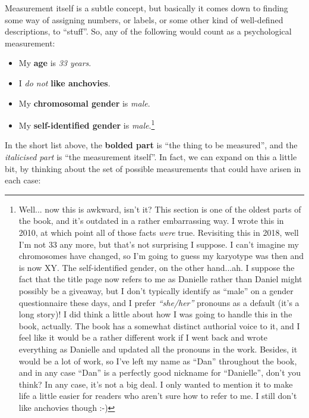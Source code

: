 
Measurement itself is a subtle concept, but basically it comes down to finding some way of assigning numbers, or labels, or some other kind of well-defined descriptions, to ``stuff''. So, any of the following would count as a psychological measurement:

\begin{itemize} \itemsep 0pt
\item My {\bf age} is {\it 33 years}.
\item I {\it do not} {\bf like anchovies}.
\item My {\bf chromosomal gender} is {\it male}. 
\item My {\bf self-identified gender} is {\it male}.\footnote{Well... now this is awkward, isn't it? This section is one of the oldest parts of the book, and it's outdated in a rather embarrassing way. I wrote this in 2010, at which point all of those facts {\it were} true. Revisiting this in 2018, well I'm not 33 any more, but that's not surprising I suppose. I can't imagine my chromosomes have changed, so I'm going to guess my karyotype was then and is now XY. The self-identified gender, on the other hand...ah. I suppose the fact that the title page now refers to me as Danielle rather than Daniel might possibly be a giveaway, but I don't typically identify as ``male'' on a gender questionnaire these days, and I prefer {\it ``she/her''} pronouns as a default (it's a long story)!  I did think a little about how I was going to handle this in the book, actually. The book has a somewhat distinct authorial voice to it, and I feel like it would be a rather different work if I went back and wrote everything as Danielle and updated all the pronouns in the work. Besides, it would be a lot of work, so I've left my name as  ``Dan'' throughout the book, and in any case ``Dan'' is a perfectly good nickname for ``Danielle'', don't you think? In any case, it's not a big deal. I only wanted to mention it to make life a little easier for readers who aren't sure how to refer to me. I still don't like anchovies though :-)} 
\end{itemize}

In the short list above, the {\bf  bolded part} is ``the thing to be measured'', and the {\it italicised part} is ``the measurement itself''. In fact, we can expand on this a little bit, by thinking about the set of possible measurements that could have arisen in each case:

